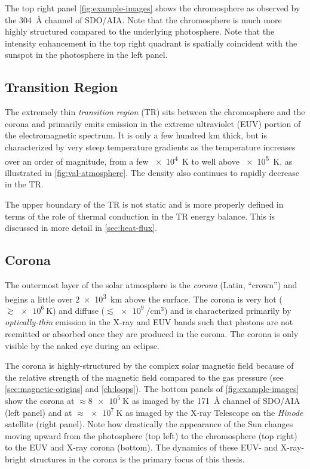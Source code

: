 The top right panel \autoref{fig:example-images} shows the chromosphere as observed by the \SI{304}{\angstrom} channel of SDO/AIA. Note that the chromosphere is much more highly structured compared to the underlying photosphere. Note that the intensity enhancement in the top right quadrant is spatially coincident with the sunspot in the photosphere in the left panel.

\subsection{Transition Region}\label{sec:transition_region}

The extremely thin \textit{transition region} (TR) sits between the chromosphere and the corona and primarily emits emission in the extreme ultraviolet (EUV) portion of the electromagnetic spectrum. It is only a few hundred \si{\km} thick, but is characterized by very steep temperature gradients as the temperature increases over an order of magnitude, from a few \SI{e4}{\kelvin} to well above \SI{e5}{\kelvin}, as illustrated in \autoref{fig:val-atmosphere}. The density also continues to rapidly decrease in the TR.

The upper boundary of the TR is not static and is more properly defined in terms of the role of thermal conduction in the TR energy balance. This is discussed in more detail in \autoref{sec:heat-flux}.

\subsection{Corona}\label{sec:corona}

The outermost layer of the solar atmosphere is the \textit{corona} (Latin, ``crown'') and begins a little over \SI{2e3}{\km} above the surface. The corona is very hot ($\gtrsim\SI{e6}{\kelvin}$) and diffuse ($\lesssim\SI{e9}{\per\cubic\cm}$) and is characterized primarily by \textit{optically-thin} emission in the X-ray and EUV bands such that photons are not reemitted or absorbed once they are produced in the corona. The corona is only visible by the naked eye during an eclipse.

The corona is highly-structured by the complex solar magnetic field because of the relative strength of the magnetic field compared to the gas pressure (see \autoref{sec:magnetic-origins} and \autoref{ch:loops}). The bottom panels of \autoref{fig:example-images} show the corona at $\approx\SI{8e5}{\kelvin}$ as imaged by the \SI{171}{\angstrom} channel of SDO/AIA (left panel) and at $\approx\SI{e7}{\kelvin}$ as imaged by the X-ray Telescope \citep[XRT][]{golub_x-ray_2007} on the \textit{Hinode} satellite \citep{kosugi_hinode_2007} (right panel). Note how drastically the appearance of the Sun changes moving upward from the photosphere (top left) to the chromosphere (top right) to the EUV and X-ray corona (bottom). The dynamics of these EUV- and X-ray-bright structures in the corona is the primary focus of this thesis.

